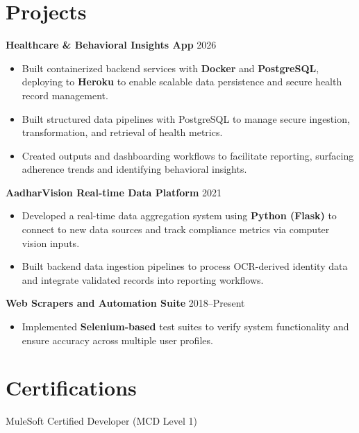 \documentclass[letterpaper,11pt]{article}
\begin{document}
\section*{Projects}
\textbf{Healthcare \& Behavioral Insights App} \hfill 2026
\begin{itemize}
\item Built containerized backend services with \textbf{Docker} and \textbf{PostgreSQL}, deploying to \textbf{Heroku} to enable scalable data persistence and secure health record management.
\item Built structured data pipelines with PostgreSQL to manage secure ingestion, transformation, and retrieval of health metrics.
\item Created outputs and dashboarding workflows to facilitate reporting, surfacing adherence trends and identifying behavioral insights.
\end{itemize}

\textbf{AadharVision Real-time Data Platform} \hfill 2021
\begin{itemize}
\item Developed a real-time data aggregation system using \textbf{Python (Flask)} to connect to new data sources and track compliance metrics via computer vision inputs.
\item Built backend data ingestion pipelines to process OCR-derived identity data and integrate validated records into reporting workflows.
\end{itemize}

\textbf{Web Scrapers and Automation Suite} \hfill 2018--Present
\begin{itemize}
\item Implemented \textbf{Selenium-based} test suites to verify system functionality and ensure accuracy across multiple user profiles.
\end{itemize}


\section*{Certifications}
MuleSoft Certified Developer (MCD Level 1)
\end{document}
